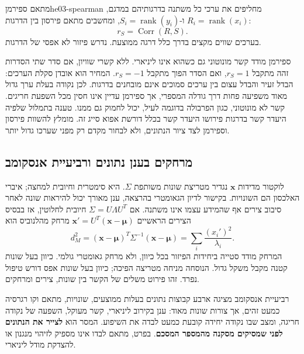 \begin{definition}{מתאם ספירמן}{he03-spearman}
מחליפים את ערכי כל משתנה בדרגותיהם במדגם, $R_i=\operatorname{rank}(x_i)$ ו-$S_i=\operatorname{rank}(y_i)$, ומחשבים מתאם פירסון בין הדרגות:
\begin{equation}\label{eq:he03-spearman}
r_S=\operatorname{Corr}(R,S).
\end{equation}
בערכים שווים מקצים בדרך כלל דרגה ממוצעת. נדרש פיזור לא אפסי של הדרגות.
\end{definition}
ספירמן מודד קשר מונוטוני גם כשהוא אינו ליניארי. ללא קשרי שוויון, אם סדר שתי הסדרות זהה מתקבל $r_S=1$, ואם הסדר הפוך מתקבל $r_S=-1$. המחיר הוא אובדן סקלת הערכים: הבדל זעיר והבדל עצום בין ערכים סמוכים אינם מובחנים בדרגות. לכן נקודה בעלת ערך גדול מאוד משפיעה פחות דרך גודלה המספרי, אך ספירמן עדיין אינו חסין מכל השפעת חריגים. קשר לא מונוטוני, כגון הפרבולה בדוגמה לעיל, יכול לחמוק גם ממנו. טענה בתמלול שלפיה היעדר קשר בדרגות פירושו היעדר קשר בכלל דורשת אפוא סייג זה. מומלץ להשוות פירסון וספירמן לצד ציור הנתונים, ולא לבחור מקדם רק מפני שערכו גדול יותר.

\subsection{מרחקים בענן נתונים ורביעיית אנסקומב}\label{sec:he03-anscombe}
לוקטור מדידות $\mathbf{x}$ נגדיר מטריצת שונות משותפת $\Sigma$. היא סימטרית וחיובית למחצה; איברי האלכסון הם השונויות. בקישור לדיון הגאומטרי בהרצאה, ענן מאורך יכול להיראות שונה לאחר סיבוב צירים אף שהמידע עצמו אינו משתנה. אם $\Sigma=U\Lambda U^T$ חיובית לחלוטין, אז בבסיס הצירים הראשיים $\mathbf{x}'=U^T(\mathbf{x}-\boldsymbol\mu)$ מרחק מהלנוביס הוא
\begin{equation}\label{eq:he03-mahalanobis}
d_M^2=(\mathbf{x}-\boldsymbol\mu)^T\Sigma^{-1}(\mathbf{x}-\boldsymbol\mu)
=\sum_i\frac{(x_i')^2}{\lambda_i}.
\end{equation}
המרחק מודד סטייה ביחידות הפיזור בכל כיוון, ולא מרחק גאומטרי גולמי. כיוון בעל שונות קטנה מקבל משקל גדול. הנוסחה מניחה מטריצה הפיכה; כיוון בעל שונות אפס דורש טיפול נפרד. זהו פירוט משלים של הקשר בין שונות, צירים ומרחקים.

רביעיית אנסקומב מציגה ארבע קבוצות נתונים בעלות ממוצעים, שונויות, מתאם וקו רגרסיה כמעט זהים, אך צורות שונות מאוד: ענן בקירוב ליניארי, קשר מעוקל, השפעה של נקודה חריגה, ומצב שבו נקודה יחידה קובעת כמעט לבדה את השיפוע. המסר הוא \textbf{לצייר את הנתונים לפני שמסיקים מסקנה מהמספר המסכם}. בפרט, מתאם לבדו אינו מספיק לזיהוי מנגנון או להצדקת מודל ליניארי.

